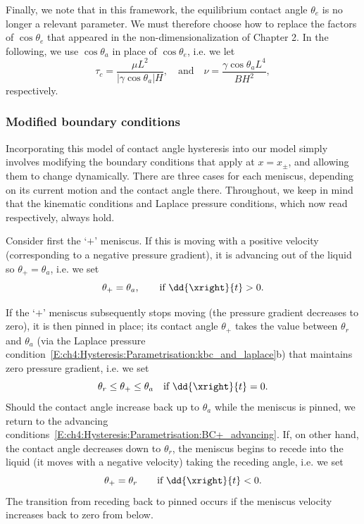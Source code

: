 Finally, we note that in this framework, the equilibrium contact angle $\theta_e$ is no longer a relevant parameter. We must therefore choose how to replace the factors of $\cos \theta_e$ that appeared in the non-dimensionalization of Chapter 2. In the following, we use $\cos \theta_a$ in place of $\cos \theta_e$, i.e. we let
\begin{equation}\label{E:ch4:Hysteresis:Parametrisation:modified_nu_def}
\tau_c = \frac{\mu L^2}{|\gamma \cos \theta_a|H}, \quad\text{and}\quad \nu = \frac{\gamma \cos \theta_a L^4}{BH^2},
\end{equation}
respectively.

\subsubsection{Modified boundary conditions}
Incorporating this model of contact angle hysteresis into our model simply involves modifying the boundary conditions that apply at $x =x_{\pm}$, and allowing them to change dynamically. There are three cases for each meniscus, depending on its current motion and the contact angle there. Throughout, we keep in mind that the kinematic conditions and Laplace pressure conditions, which now read
respectively, always hold.

Consider first the `$+$' meniscus. If this is moving with a positive velocity (corresponding to a negative pressure gradient), it is advancing out of the liquid so $\theta_+ = \theta_a$, i.e. we set
\begin{equation}\label{E:ch4:Hysteresis:Parametrisation:BC+_advancing}
\theta_+ = \theta_a, \qquad \text{if}~\dd{\xright}{t} > 0.
\end{equation}

If the `$+$' meniscus subsequently stops moving (the pressure gradient decreases to zero), it is then pinned in place; its contact angle $\theta_+$ takes the value between $\theta_r$ and $\theta_a$  (via the Laplace pressure condition~\eqref{E:ch4:Hysteresis:Parametrisation:kbc_and_laplace}b) that maintains zero pressure gradient, i.e. we set \begin{equation}\label{E:ch4:Hysteresis:Parametrisation:BC+_pinned}
\theta_r \leq \theta_+ \leq \theta_a \quad \text{if}~\dd{\xright}{t}  = 0.
\end{equation}
Should the contact angle increase back up to $\theta_a$ while the meniscus is pinned, we return to the advancing conditions~\eqref{E:ch4:Hysteresis:Parametrisation:BC+_advancing}. If, on other hand, the contact angle decreases down to $\theta_r$, the meniscus begins to recede into the liquid (it moves with a negative velocity) taking the receding angle, i.e. we set
\begin{equation}\label{E:ch4:Hysteresis:Parametrisation:BC+_receding}
\theta_+ = \theta_r \qquad \text{if}~\dd{\xright}{t} <0.
\end{equation}
The transition from receding back to pinned occurs if the meniscus velocity increases back to zero from below.

